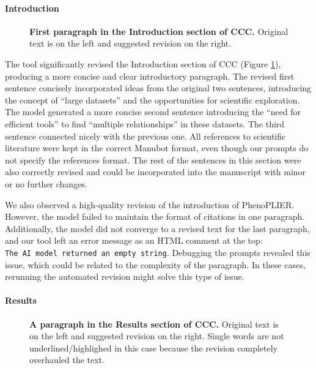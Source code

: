 \documentclass[
]{article}
\begin{document}
\paragraph{Introduction}

\begin{figure}
\hypertarget{fig:intro:ccc}{%
\centering

\caption{\textbf{First paragraph in the Introduction section of CCC.}
Original text is on the left and suggested revision on the right.}\label{fig:intro:ccc}
}
\end{figure}

The tool significantly revised the Introduction section of CCC (Figure \ref{fig:intro:ccc}), producing a more concise and clear introductory paragraph.
The revised first sentence concisely incorporated ideas from the original two sentences, introducing the concept of ``large datasets'' and the opportunities for scientific exploration.
The model generated a more concise second sentence introducing the ``need for efficient tools'' to find ``multiple relationships'' in these datasets.
The third sentence connected nicely with the previous one.
All references to scientific literature were kept in the correct Manubot format, even though our prompts do not specify the references format.
The rest of the sentences in this section were also correctly revised and could be incorporated into the manuscript with minor or no further changes.

We also observed a high-quality revision of the introduction of PhenoPLIER.
However, the model failed to maintain the format of citations in one paragraph.
Additionally, the model did not converge to a revised text for the last paragraph, and our tool left an error message as an HTML comment at the top: \texttt{The\ AI\ model\ returned\ an\ empty\ string}.
Debugging the prompts revealed this issue, which could be related to the complexity of the paragraph.
In these cases, rerunning the automated revision might solve this type of issue.

\paragraph{Results}

\begin{figure}
\hypertarget{fig:results:ccc}{%
\centering

\caption{\textbf{A paragraph in the Results section of CCC.}
Original text is on the left and suggested revision on the right.
Single words are not underlined/highlighed in this case because the revision completely overhauled the text.}\label{fig:results:ccc}
}
\end{figure}
\end{document}

